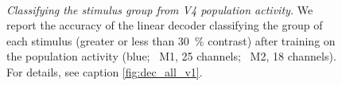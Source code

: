 \begin{figure}[htbp]
{    }
    \hspace*{\fill}
    \\
    \hspace*{\fill}
    \hspace*{\fill}\hspace{.2cm}\hspace*{\fill}
    \hspace*{\fill}
    \caption{%
    \textit{Classifying the stimulus group from \ac{V4} population activity.}
    We report the accuracy of the linear decoder classifying the group of each stimulus (greater or less than \SI{30}{\percent} contrast) after training on the population activity (blue; \protect{}~\ac{M1}, \num{25} channels; \protect{}~\ac{M2}, \num{18} channels).
    For details, see caption \autoref{fig:dec_all_v1}.
}
    \label{fig:dec_all_v4}
\end{figure}

